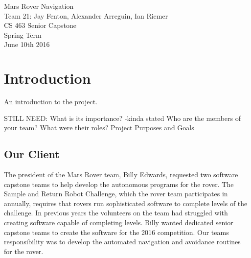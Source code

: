 \documentclass[10pt, oneside,onecolumn]{IEEEtran}
\begin{document}
\setcounter{tocdepth}{0}
\tableofcontents

\begin{titlepage}
\begin{center}
        \vspace*{6cm}
        {\Huge Mars Rover Navigation}\\[1cm]
        {\Large Team 21: Jay Fenton, Alexander Arreguin, Ian Riemer}\\[.5cm]
        {\Large CS 463 Senior Capstone}\\[.5cm]
        {\Large Spring Term}\\[.5cm]
        {\Large June 10th 2016}\\[8cm]
\end{center}

\end{titlepage}

\section{Introduction}

An introduction to the project.

STILL NEED:
What is its importance? -kinda stated
Who are the members of your team?
What were their roles?
Project Purposes and Goals


\subsection{Our Client}

The president of the Mars Rover team, Billy Edwards, requested two software capstone teams to help develop the autonomous programs for the rover. The Sample and Return Robot Challenge, which the rover team participates in annually, requires that rovers run sophisticated software to complete levels of the challenge. In previous years the volunteers on the team had struggled with creating software capable of completing levels. Billy wanted dedicated senior capstone teams to create the software for the 2016 competition. Our teams responsibility was to develop the automated navigation and avoidance routines for the rover. 
\end{document}

